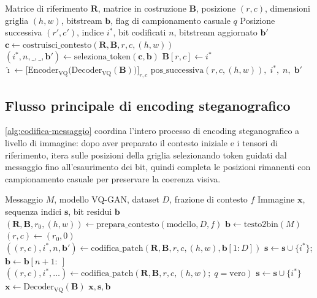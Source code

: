 \begin{algorithm}[tbhp]
\caption{Codifica vincolata di un singolo token}
\label{alg:codifica-patch}
\begin{algorithmic}[1]
\Require Matrice di riferimento $\mathbf{R}$, matrice in costruzione $\mathbf{B}$, posizione $(r,c)$, dimensioni griglia $(h,w)$, bitstream $\mathbf{b}$, flag di campionamento casuale $q$
\Ensure Posizione successiva $(r', c')$, indice $i^*$, bit codificati $n$, bitstream aggiornato $\mathbf{b}'$
\State $\mathbf{c} \gets \mathrm{costruisci\_contesto}(\mathbf{R}, \mathbf{B}, r, c, (h,w))$
\Repeat
\State $(i^*, n, \_, \_, \mathbf{b}') \gets \mathrm{seleziona\_token}(\mathbf{c}, \mathbf{b})$
\State $\mathbf{B}[r, c] \gets i^*$
\State $\hat{\imath} \gets \bigl[\mathrm{Encoder_{VQ}}\bigl(\mathrm{Decoder_{VQ}}(\mathbf{B})\bigr)\bigr]_{r,c}$
\State \Return $\mathrm{pos\_successiva}(r, c, (h,w)),\; i^*,\; n,\; \mathbf{b}'$
\end{algorithmic}
\end{algorithm}

\subsection{Flusso principale di encoding steganografico}

\autoref{alg:codifica-messaggio} coordina l'intero processo di encoding steganografico a livello di immagine: dopo aver preparato il contesto iniziale e i tensori di riferimento, itera sulle posizioni della griglia selezionando token guidati dal messaggio fino all'esaurimento dei bit, quindi completa le posizioni rimanenti con campionamento casuale per preservare la coerenza visiva.

\begin{algorithm}[tbhp]
\caption{Codifica steganografica del messaggio in immagine}
\label{alg:codifica-messaggio}
\begin{algorithmic}[1]
\Require Messaggio $M$, modello VQ-GAN, dataset $D$, frazione di contesto $f$
\Ensure Immagine $\mathbf{x}$, sequenza indici $\mathbf{s}$, bit residui $\mathbf{b}$
\State $(\mathbf{R}, \mathbf{B}, r_0, (h,w)) \gets \mathrm{prepara\_contesto}(\mathrm{modello}, D, f)$
\State $\mathbf{b} \gets \mathrm{testo2bin}(M)$ 
\State $(r, c) \gets (r_0, 0)$
\State $((r, c), i^*, n, \mathbf{b}') \gets \mathrm{codifica\_patch}(\mathbf{R}, \mathbf{B}, r, c, (h,w), \mathbf{b}[1:D])$
\State $\mathbf{s} \gets \mathbf{s} \cup \{i^*\}$;\quad $\mathbf{b} \gets \mathbf{b}[n+1:\ ]$
\EndWhile
{}
	\State $((r,c), i^*, \dots) \gets \mathrm{codifica\_patch}(\mathbf{R}, \mathbf{B}, r, c, (h,w);\; q=\mathrm{vero})$
\State $\mathbf{s} \gets \mathbf{s} \cup \{i^*\}$
\EndWhile
\State $\mathbf{x} \gets \mathrm{Decoder_{VQ}}(\mathbf{B})$
\State \Return $\mathbf{x}, \mathbf{s}, \mathbf{b}$
\end{algorithmic}
\end{algorithm}

